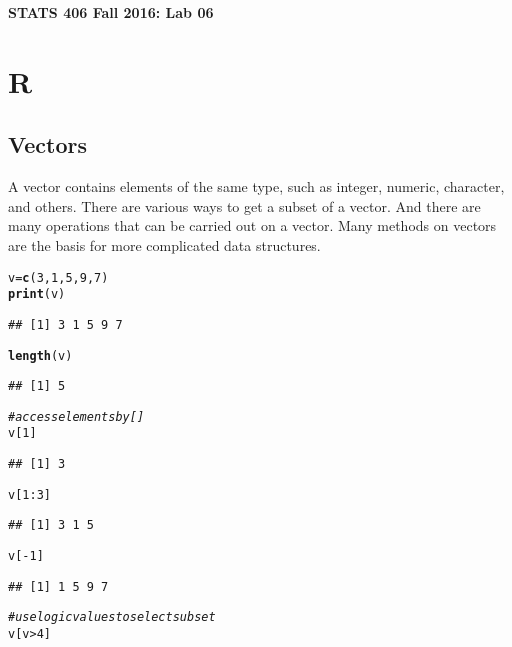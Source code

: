 \documentclass[12pt]{article}\usepackage[]{graphicx}\usepackage[]{color}
\makeatletter
\newcommand{\hlnum}[1]{\textcolor[rgb]{0.686,0.059,0.569}{#1}}%
\newcommand{\hlcom}[1]{\textcolor[rgb]{0.678,0.584,0.686}{\textit{#1}}}%
\newcommand{\hlopt}[1]{\textcolor[rgb]{0,0,0}{#1}}%
\newcommand{\hlstd}[1]{\textcolor[rgb]{0.345,0.345,0.345}{#1}}%
\newcommand{\hlkwb}[1]{\textcolor[rgb]{0.69,0.353,0.396}{#1}}%
\newcommand{\hlkwd}[1]{\textcolor[rgb]{0.737,0.353,0.396}{\textbf{#1}}}%
\newenvironment{kframe}{%
 \def\at@end@of@kframe{}%
 \ifinner\ifhmode%
  \def\at@end@of@kframe{\end{minipage}}%
  \begin{minipage}{\columnwidth}%
 \fi\fi%
 \def\FrameCommand##1{\hskip\@totalleftmargin \hskip-\fboxsep
 \colorbox{shadecolor}{##1}\hskip-\fboxsep
     \hskip-\linewidth \hskip-\@totalleftmargin \hskip\columnwidth}%
 \MakeFramed {\advance\hsize-\width
   \@totalleftmargin\z@ \linewidth\hsize
   \@setminipage}}%
 {\par\unskip\endMakeFramed%
 \at@end@of@kframe}
\newenvironment{knitrout}{}{} %
\makeatother
\begin{document}
\begin{center}
\bf
\LARGE
STATS 406 Fall 2016: Lab 06
\end{center}

\section{R}
\subsection{Vectors}
A vector contains elements of the same type, such as integer, numeric, character, and others. There are various ways to get a subset of a vector. And there are many operations that can be carried out on a vector. Many methods on vectors are the basis for more complicated data structures.
\begin{knitrout}
\color{fgcolor}\begin{kframe}
\begin{alltt}
\hlstd{v} \hlkwb{=} \hlkwd{c}\hlstd{(}\hlnum{3}\hlstd{,}\hlnum{1}\hlstd{,}\hlnum{5}\hlstd{,}\hlnum{9}\hlstd{,}\hlnum{7}\hlstd{)}
\hlkwd{print}\hlstd{(v)}
\end{alltt}
\begin{verbatim}
## [1] 3 1 5 9 7
\end{verbatim}
\begin{alltt}
\hlkwd{length}\hlstd{(v)}
\end{alltt}
\begin{verbatim}
## [1] 5
\end{verbatim}
\begin{alltt}
\hlcom{# access elements by []}
\hlstd{v[}\hlnum{1}\hlstd{]}
\end{alltt}
\begin{verbatim}
## [1] 3
\end{verbatim}
\begin{alltt}
\hlstd{v[}\hlnum{1}\hlopt{:}\hlnum{3}\hlstd{]}
\end{alltt}
\begin{verbatim}
## [1] 3 1 5
\end{verbatim}
\begin{alltt}
\hlstd{v[}\hlopt{-}\hlnum{1}\hlstd{]}
\end{alltt}
\begin{verbatim}
## [1] 1 5 9 7
\end{verbatim}
\begin{alltt}
\hlcom{# use logic values to select subset}
\hlstd{v[v}\hlopt{>}\hlnum{4}\hlstd{]}

\end{alltt}
\end{kframe}
\end{knitrout}
\end{document}
